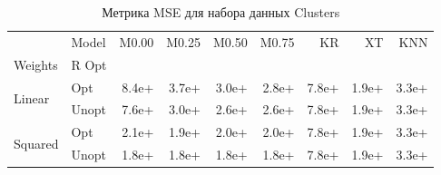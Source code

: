 \begin{table}
\caption{Метрика MSE для набора данных Clusters}
\label{tab:MSE_Clusters}
\begin{tabular}{llrrrrrrr}
\toprule
 & Model & M0.00 & M0.25 & M0.50 & M0.75 & KR & XT & KNN \\
Weights & R Opt &  &  &  &  &  &  &  \\
\midrule
\multirow[t]{2}{*}{Linear} & Opt & 8.4e+ & 3.7e+ & 3.0e+ & 2.8e+ & 7.8e+ & 1.9e+ & 3.3e+ \\
 & Unopt & 7.6e+ & 3.0e+ & 2.6e+ & 2.6e+ & 7.8e+ & 1.9e+ & 3.3e+ \\

\multirow[t]{2}{*}{Squared} & Opt & 2.1e+ & 1.9e+ & 2.0e+ & 2.0e+ & 7.8e+ & 1.9e+ & 3.3e+ \\
 & Unopt & 1.8e+ & 1.8e+ & 1.8e+ & 1.8e+ & 7.8e+ & 1.9e+ & 3.3e+ \\

\bottomrule
\end{tabular}
\end{table}
